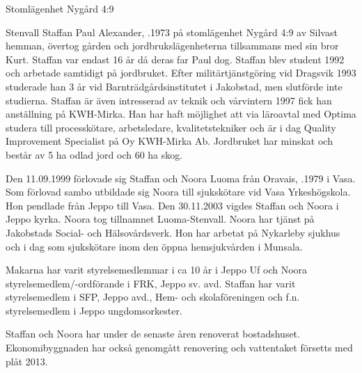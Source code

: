 %

Stomlägenhet Nygård 4:9


%
Stenvall Staffan Paul Alexander, .1973 på stomlägenhet Nygård 4:9 av Silvast hemman, övertog gården och jordbrukslägenheterna tillsammans med sin bror Kurt. Staffan var endast 16 år då deras far Paul dog. Staffan blev student 1992 och arbetade samtidigt på jordbruket. Efter militärtjänstgöring vid Dragsvik 1993 studerade han 3 år vid Barnträdgårdsinstitutet i Jakobstad, men slutförde inte studierna. Staffan är även intresserad av teknik och vårvintern 1997 fick han anställning på KWH-Mirka. Han har haft möjlighet att via läroavtal med Optima studera till processkötare, arbetsledare, kvalitetstekniker och är i dag Quality Improvement Specialist på Oy KWH-Mirka Ab. Jordbruket har minskat och består av 5 ha odlad jord och 60 ha skog.

Den 11.09.1999 förlovade sig Staffan och Noora Luoma från Oravais,	.1979 i Vasa. Som förlovad sambo utbildade sig Noora till sjukskötare vid Vasa Yrkeshögskola. Hon pendlade från Jeppo till Vasa. Den 30.11.2003 vigdes Staffan och Noora i Jeppo kyrka. Noora tog tillnamnet Luoma-Stenvall. Noora har tjänst på Jakobstads Social- och Hälsovårdsverk. Hon har arbetat på Nykarleby sjukhus och i dag som sjukskötare inom den öppna hemsjukvården i Munsala.
\begin{jhchildren}
  \item {}
  \item {}
  \item {}
\end{jhchildren}
Makarna har varit styrelsemedlemmar i ca 10 år i Jeppo Uf och Noora styrelsemedlem/-ordförande i FRK, Jeppo sv. avd. Staffan har varit styrelsemedlem i SFP, Jeppo avd., Hem- och skolaföreningen och f.n. styrelsemedlem i Jeppo ungdomsorkester.

Staffan och Noora har under de senaste åren renoverat bostadshuset. Ekonomibyggnaden har också genomgått renovering och vattentaket försetts med plåt 2013.


